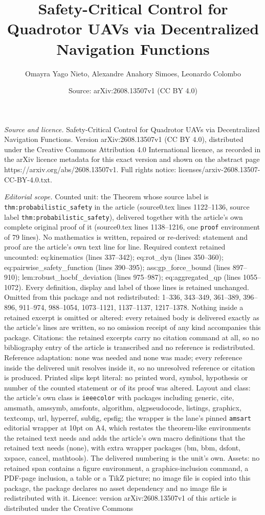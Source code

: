 \documentclass[10pt,a4paper]{amsart}
\title[Safety-Critical Control for Quadrotor UAVs via Decentralized]{Safety-Critical Control for Quadrotor UAVs via Decentralized Navigation Functions}
\author{Omayra Yago Nieto, Alexandre Anahory Simoes, Leonardo Colombo}
\date{Source: arXiv:2608.13507v1 (CC BY 4.0)}
\begin{document}
\maketitle

\noindent\emph{Source and licence.} Safety-Critical Control for Quadrotor UAVs via Decentralized Navigation Functions. Version arXiv:2608.13507v1 (CC BY 4.0), distributed under the Creative Commons Attribution 4.0 International licence, as recorded in the arXiv licence metadata for this exact version and shown on the abstract page https://arxiv.org/abs/2608.13507v1. Full rights notice: licenses/arxiv-2608.13507-CC-BY-4.0.txt.\par\smallskip

\noindent\textit{Editorial scope.} Counted unit: the Theorem whose source label is \texttt{thm:probabilistic\_safety} in the article (source0.tex lines 1122--1136, source label \texttt{thm:probabilistic\_safety}), delivered together with the article's own complete original proof of it (source0.tex lines 1138--1216, one \texttt{proof} environment of 79 lines). No mathematics is written, repaired or re-derived: statement and proof are the article's own text line for line. Required context retained uncounted: eq:kinematics (lines 337--342); eq:rot\_dyn (lines 350--360); eq:pairwise\_safety\_function (lines 390--395); ass:gp\_force\_bound (lines 897--910); lem:robust\_hocbf\_deviation (lines 975--987); eq:aggregated\_qp (lines 1055--1072). Every definition, display and label of those lines is retained unchanged. Omitted from this package and not redistributed: 1--336, 343--349, 361--389, 396--896, 911--974, 988--1054, 1073--1121, 1137--1137, 1217--1378. Nothing inside a retained excerpt is omitted or altered: every retained body is delivered exactly as the article's lines are written, so no omission receipt of any kind accompanies this package. Citations: the retained excerpts carry no citation command at all, so no bibliography entry of the article is transcribed and no reference is redistributed. Reference adaptation: none was needed and none was made; every reference inside the delivered unit resolves inside it, so no unresolved reference or citation is produced. Printed slips kept literal: no printed word, symbol, hypothesis or number of the counted statement or of its proof was altered. Layout and class: the article's own class is \texttt{ieeecolor} with packages including generic, cite, amsmath, amssymb, amsfonts, algorithm, algpseudocode, listings, graphicx, textcomp, url, hyperref, subfig, epsfig; the wrapper is the lane's pinned \texttt{amsart} editorial wrapper at 10pt on A4, which restates the theorem-like environments the retained text needs and adds the article's own macro definitions that the retained text needs (none), with extra wrapper packages (bm, bbm, dsfont, xspace, cancel, mathtools). The delivered numbering is the unit's own. Assets: no retained span contains a figure environment, a graphics-inclusion command, a PDF-page inclusion, a table or a TikZ picture; no image file is copied into this package, the package declares no asset dependency and no image file is redistributed with it. Licence: version arXiv:2608.13507v1 of this article is distributed under the Creative Commons 
\end{document}
